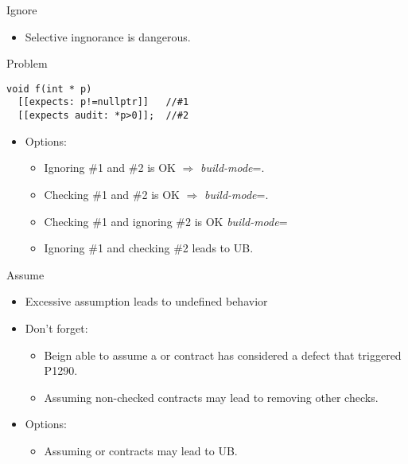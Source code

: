 \begin{frame}[t,fragile]{Ignore}
\begin{itemize}
  \item Selective ingnorance is dangerous.
\end{itemize}
\begin{block}{Problem}
\begin{lstlisting}
void f(int * p)
  [[expects: p!=nullptr]]   //#1
  [[expects audit: *p>0]];  //#2
\end{lstlisting}
\end{block}
\begin{itemize}
  \item Options:
  \begin{itemize}
    \item Ignoring \#1 and \#2 is OK $\Rightarrow$ \emph{build-mode}=.
    \item Checking \#1 and \#2 is OK $\Rightarrow$ \emph{build-mode}=.
    \item Checking \#1 and ignoring \#2 is OK \emph{build-mode}=
    \item Ignoring \#1 and checking \#2 leads to \alert{UB}.
  \end{itemize}
\end{itemize}
\end{frame}

\begin{frame}[t,fragile]{Assume}
\begin{itemize}
  \item Excessive assumption leads to undefined behavior
  \vfill
  \item Don't forget:
    \begin{itemize}
      \item Beign able to assume a  or  contract
            has considered a defect that triggered P1290.
      \item Assuming non-checked contracts may lead to removing other checks.
    \end{itemize}
  \vfill
  \item Options:
    \begin{itemize}
      \item Assuming  or  contracts may lead to UB.
    \end{itemize}
\end{itemize}
\end{frame}

